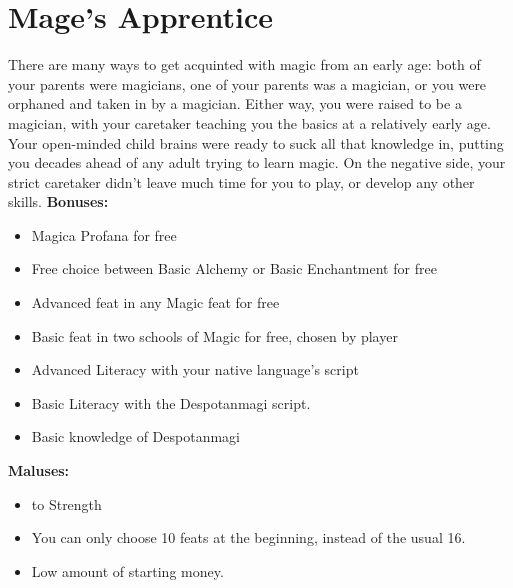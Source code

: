 \section{Mage's Apprentice}
There are many ways to get acquinted with magic from an early age: both of your parents were magicians, one of your parents was a magician, or you were orphaned and taken in by a magician. Either way, you were raised to be a magician, with your caretaker teaching you the basics at a relatively early age. Your open-minded child brains were ready to suck all that knowledge in, putting you decades ahead of any adult trying to learn magic. On the negative side, your strict caretaker didn't leave much time for you to play, or develop any other skills.\newline
\textbf{Bonuses:}
\begin{itemize}
	\item Magica Profana for free
	\item Free choice between Basic Alchemy or Basic Enchantment for free
	\item Advanced feat in any Magic feat  for free
	\item Basic feat in two schools of Magic for free, chosen by player
	\item Advanced Literacy with your native language's script
	\item Basic Literacy with the Despotanmagi script.
	\item Basic knowledge of Despotanmagi 
\end{itemize}
\textbf{Maluses:}
\begin{itemize}
	\item {} to Strength
	\item You can only choose 10 feats at the beginning, instead of the usual 16.
	\item Low amount of starting money.
\end{itemize}
